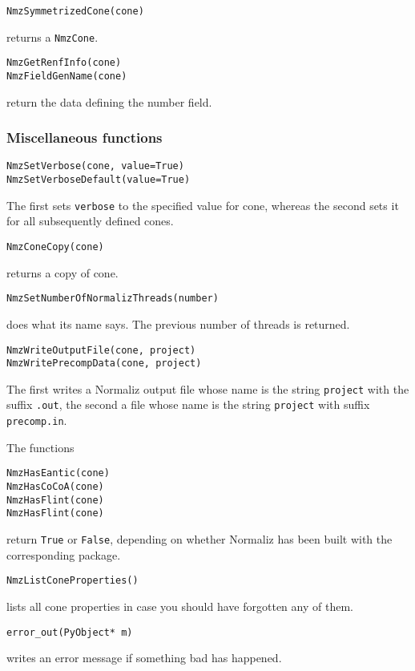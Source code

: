 \begin{small}
\begin{Verbatim}
NmzSymmetrizedCone(cone)
\end{Verbatim}
returns a \verb|NmzCone|.

\begin{Verbatim}
NmzGetRenfInfo(cone)
NmzFieldGenName(cone)
\end{Verbatim}
return the data defining the number field.

\subsubsection{Miscellaneous functions}

\begin{Verbatim}
NmzSetVerbose(cone, value=True)
NmzSetVerboseDefault(value=True)
\end{Verbatim}
The first sets \verb|verbose| to the specified value for cone, whereas the second sets it for all subsequently defined cones.

\begin{Verbatim}
NmzConeCopy(cone)
\end{Verbatim}
returns a copy of cone.

\begin{Verbatim}
NmzSetNumberOfNormalizThreads(number)
\end{Verbatim}
does what its name says. The previous number of threads is returned.

\begin{Verbatim}
NmzWriteOutputFile(cone, project)
NmzWritePrecompData(cone, project)
\end{Verbatim}
The first writes a Normaliz output file whose name is the string \verb|project| with the suffix \verb|.out|, the second a file whose name is the string \verb|project| with suffix \verb|precomp.in|.


The functions
\begin{Verbatim}
NmzHasEantic(cone)
NmzHasCoCoA(cone)
NmzHasFlint(cone)
NmzHasFlint(cone)
\end{Verbatim}
return \verb|True| or \verb|False|, depending on whether Normaliz has been built with the corresponding package.

\begin{Verbatim}
NmzListConeProperties() 
\end{Verbatim}
lists all cone properties in case you should have forgotten any of them.

\begin{Verbatim}
error_out(PyObject* m)
\end{Verbatim}
writes an error message if something bad has happened.


\end{small}
